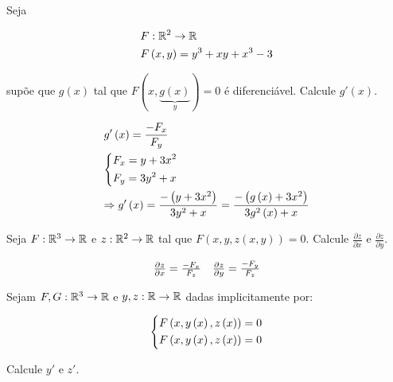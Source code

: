 \documentclass{book}
\begin{document}
\begin{ex}
Seja

\[
\begin{gathered}
F:\R^2  \to \R \hfill \\
F\left( {x,y} \right) = y^3  + xy + x^3  - 3 \hfill \\
\end{gathered}
\]

    sup\~oe que $g(x)$ tal que $F\left( {x,\underbrace {g\left( x \right)}_y} \right) = 0$ \'e diferenci\'avel. Calcule $g'\left( x \right)$.
\end{ex}

\begin{sol}
\[
\begin{gathered}
g'\left( x \right) = \frac{{ - F_x }}
{{F_y }} \hfill \\
\left\{ \begin{gathered}
F_x  = y + 3x^2  \hfill \\
F_y  = 3y^2  + x \hfill \\
\end{gathered}  \right. \hfill \\
\Rightarrow g'\left( x \right) = \frac{{ - \left( {y + 3x^2 } \right)}}
{{3y^2  + x}} = \frac{{ - \left( {g\left( x \right) + 3x^2 } \right)}}
{{3g^2 \left( x \right) + x}} \hfill \\
\end{gathered}
\]

\end{sol}

\begin{ex}
    Seja $F:\mathbb{R}^3  \to \mathbb{R}$ e $z:\mathbb{R}^2  \to \mathbb{R}$ tal que $F\left( {x,y,z\left( {x,y} \right)} \right) = 0$. Calcule $\frac{{\partial z}}{{\partial x}}$ e $\frac{{\partial z}}{{\partial y}}$.
\end{ex}

\begin{sol}
\[
\begin{array}{*{20}c}
{\frac{{\partial z}}
{{\partial x}} = \frac{{ - F_x }}
{{F_z }}} & {\frac{{\partial z}}
{{\partial y}} = \frac{{ - F_y }}
{{F_z }}}  \\

\end{array}
\]

\end{sol}

\begin{ex}
    Sejam $F,G:\mathbb{R}^3  \to \mathbb{R}$ e $y,z:\mathbb{R} \to \mathbb{R}$ dadas implicitamente por:

\[
\left\{ \begin{gathered}
F\left( {x,y\left( x \right),z\left( x \right)} \right) = 0 \hfill \\
F\left( {x,y\left( x \right),z\left( x \right)} \right) = 0 \hfill \\
\end{gathered}  \right.
\]

Calcule $y'$ e $z'$.
\end{ex}
\end{document}

